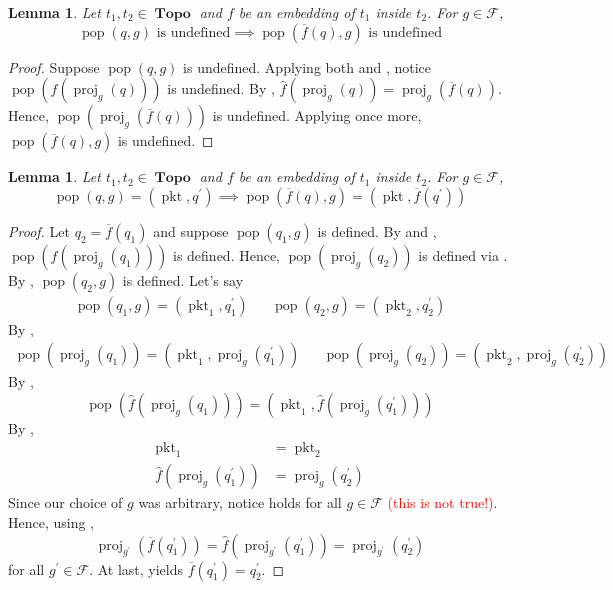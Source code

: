\documentclass{amsart}
\DeclareMathOperator{\pkt}{\mathrm{pkt}}
\DeclareMathOperator{\pop}{\mathrm{pop}}
\DeclareMathOperator{\proj}{\mathrm{proj}}
\DeclareMathOperator{\Topo}{\mathbf{Topo}}
\newtheorem{lem}[thm]{Lemma}
\theoremstyle{definition}
\begin{document}
\begin{lem}
    \label{lem:sim1}
    Let $t_1, t_2 \in \Topo$ and $f$ be an embedding of $t_1$ inside $t_2$. For $g \in \mathcal F$,
    $$\pop(q, g) \text{ is undefined} \implies \pop(\overline{f}(q), g) \text{ is undefined}$$
\end{lem}

\begin{proof}
    Suppose $\pop(q, g)$ is undefined. 
    Applying both  and \cite[Lemma ~5.6]{OG}, notice $\pop(\widehat{f}(\proj_g(q)))$ is undefined.
    By , $\widehat{f}(\proj_g(q)) = \proj_g(\overline{f}(q))$.
    Hence, $\pop(\proj_g(\overline{f}(q)))$ is undefined.
    Applying  once more, $\pop(\overline{f}(q), g)$ is undefined.
\end{proof}

\begin{lem}
    \label{lem:sim2}
    Let $t_1, t_2 \in \Topo$ and $f$ be an embedding of $t_1$ inside $t_2$. For $g \in \mathcal F$,
    $$\pop(q, g) = (\pkt, q^\prime) \implies \pop(\overline{f}(q), g) = (\pkt, \overline{f}(q^\prime))$$
\end{lem}

\begin{proof}
    Let $q_2 = \overline{f}(q_1)$ and suppose $\pop(q_1, g)$ is defined. 
    By  and \cite[Lemma ~5.6]{OG}, $\pop(\widehat{f}(\proj_g(q_1)))$ is defined.
    Hence, $\pop(\proj_g(q_2))$ is defined via .
    By , $\pop(q_2, g)$ is defined.
    Let's say 
    \begin{align*}
        \pop(q_1, g) = (\pkt_1, q_1^\prime) && \pop(q_2, g) = (\pkt_2, q_2^\prime)
    \end{align*}
    By , 
    \begin{align*}
        \pop(\proj_g(q_1)) = (\pkt_1, \proj_g(q_1^\prime)) 
        &&
        \pop(\proj_g(q_2)) = (\pkt_2, \proj_g(q_2^\prime))
    \end{align*}
    By \cite[Lemma ~5.7]{OG},
    $$\pop(\widehat{f}(\proj_g(q_1))) = (\pkt_1, \widehat{f}(\proj_g(q_1^\prime)))$$
    By ,
    \begin{align*}
        \pkt_1 &= \pkt_2\\
        \widehat{f}(\proj_g(q_1^\prime)) &= \proj_g(q_2^\prime) \label{eq:popsim} \tag{$\dagger$} 
    \end{align*}
    Since our choice of $g$ was arbitrary, notice  holds for all $g \in \mathcal F$ \textcolor{red}{(this is not true!)}.
    Hence, using ,
    $$\proj_{g^\prime}(\overline{f}(q_1^\prime)) = \widehat{f}(\proj_{g^\prime}(q_1^\prime)) = \proj_{g^\prime}(q_2^\prime)$$
    for all $g^\prime \in \mathcal F$. 
    At last,  yields $\overline{f}(q_1^\prime) = q_2^\prime$. 
\end{proof}
\end{document}

